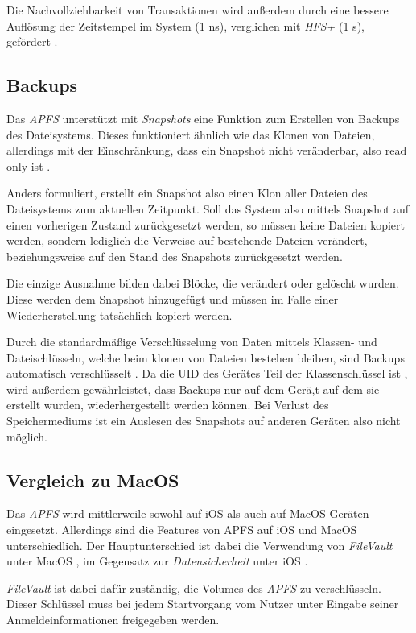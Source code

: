 Die Nachvollziehbarkeit von Transaktionen wird außerdem durch eine bessere
Auflösung der Zeitstempel im System (1 ns), verglichen mit \textit{HFS+} (1 s),
gefördert \cite{arstechnica}.


\subsection{Backups}
Das \textit{APFS} unterstützt mit \textit{Snapshots} eine Funktion zum Erstellen
von Back\-ups des Dateisystems. Dieses funktioniert ähnlich wie das Klonen von
Dateien, allerdings mit der Einschränkung, dass ein Snapshot nicht veränderbar,
also read only ist \cite{arstechnica}.

Anders formuliert, erstellt ein Snapshot also einen Klon aller Dateien des
Dateisystems zum aktuellen Zeitpunkt. Soll das System also mittels Snapshot auf
einen vorherigen Zustand zurückgesetzt werden, so müssen keine Dateien kopiert
werden, sondern lediglich die Verweise auf bestehende Dateien verändert,
beziehungsweise auf den Stand des Snapshots zurückgesetzt werden.

Die einzige Ausnahme bilden dabei Blöcke, die verändert
oder gelöscht wurden. Diese werden dem Snapshot hinzugefügt und müssen im Falle
einer Wiederherstellung tatsächlich kopiert werden.

Durch die standardmäßige Verschlüsselung von Daten mittels Klassen- und
Dateischlüsseln, welche beim klonen von Dateien bestehen bleiben, sind Back\-ups
automatisch verschlüsselt \cite[S. 50]{apple2020}. Da die UID des Gerätes Teil
der Klassenschlüssel ist \cite[S. 50]{apple2020}, wird außerdem gewährleistet,
dass Backups nur auf dem Gerä,t auf dem sie erstellt wurden, wiederhergestellt
werden können. Bei Verlust des Speichermediums ist ein Auslesen des Snapshots
auf anderen Geräten also nicht möglich.


\subsection{Vergleich zu MacOS}
Das \textit{APFS} wird mittlerweile sowohl auf iOS als auch auf MacOS Geräten
eingesetzt. Allerdings sind die Features von APFS auf iOS und MacOS
unterschiedlich. Der Hauptunterschied ist dabei die Verwendung von
\textit{FileVault} unter MacOS \cite[S. 56 ff]{apple2020}, im Gegensatz zur
\textit{Datensicherheit} unter iOS \cite[S. 48 ff]{apple2020}.

\textit{FileVault} ist dabei dafür zuständig, die Volumes des \textit{APFS} zu
verschlüsseln. Dieser Schlüssel muss bei jedem Startvorgang vom Nutzer unter
Eingabe seiner Anmeldeinformationen freigegeben werden.

